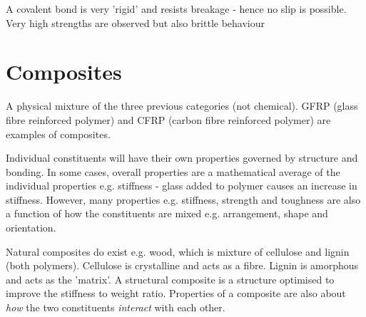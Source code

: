 A covalent bond is very 'rigid' and resists breakage - hence no slip is possible. Very high strengths are observed but also brittle behaviour
\section{Composites}
A physical mixture of the three previous categories (not chemical). GFRP (glass fibre reinforced polymer) and CFRP (carbon fibre reinforced polymer) are examples of composites.

Individual constituents will have their own properties governed by structure and bonding. In some cases, overall properties are a mathematical average of the individual properties e.g. stiffness - glass added to polymer causes an increase in stiffness. However, many properties e.g. stiffness, strength and toughness are also a function of how the constituents are mixed e.g. arrangement, shape and orientation.

Natural composites do exist e.g. wood, which is mixture of cellulose and lignin (both polymers). Cellulose is crystalline and acts as a fibre. Lignin is amorphous and acts as the 'matrix'. A structural composite is a structure optimised to improve the stiffness to weight ratio. Properties of a composite are also about \emph{how} the two constituents \emph{interact} with each other.
